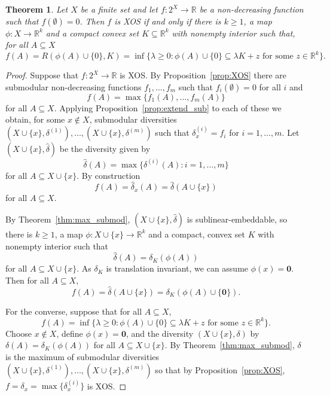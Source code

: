 \documentclass{article}
\theoremstyle{plain}
\newtheorem{theorem}{Theorem}
\theoremstyle{definition}
\newcommand{\whd}{\widehat{\delta}}
\renewcommand{\Re}{\mathbb{R}}
\begin{document}
\begin{theorem}
    Let $X$ be a finite set and let $f:2^X \rightarrow \Re$ be a non-decreasing function such that $f(\emptyset) = 0$. Then $f$ is XOS if and only if there is $k \geq 1$, a map $\phi:X \rightarrow \Re^k$ and a compact convex set $K \subseteq \Re^k$ with nonempty interior such that, for all $A \subseteq X$
\[f(A) = R(\phi(A) \cup \{0\},K) = \inf \{\lambda \geq 0: \phi(A) \cup \{0\} \subseteq \lambda K + z \mbox{ for some $z \in \Re^k $} \}.\]
\end{theorem}
\begin{proof}
    Suppose that $f:2^X \rightarrow \Re$ is XOS. By Proposition~\ref{prop:XOS} there are submodular non-decreasing functions $f_1,\ldots,f_m$ such that $f_i(\emptyset) = 0$ for all $i$ and 
    \[f(A) = \max\{f_1(A),\ldots,f_m(A)\}\]
    for all $A \subseteq X$. Applying Proposition~\ref{prop:extend_sub} to each of these we obtain, for some $x \not \in  X$, submodular diversities $(X \cup \{x\},\delta^{(1)}),\ldots,(X \cup \{x\},\delta^{(m)})$  such that $\delta^{(i)}_x = f_i$ for $i=1,\ldots,m$. Let $(X\cup \{x\},\whd)$ be the diversity given by 
    \[\whd(A) = \max\{\delta^{(i)}(A): i=1,\ldots,m\}\]
    for all $A \subseteq X \cup \{x\}$. By construction 
    \[f(A) = \whd_x(A) = \whd(A \cup \{x\})\]
    for all $A \subseteq X$.
    
    By Theorem~\ref{thm:max_submod}, $(X \cup \{x\},\whd)$ is sublinear-embeddable, so there is $k \geq 1$, a map $\phi:X \cup \{x\} \rightarrow \Re^k$ and a compact, convex set $K$ with nonempty interior such that 
    \[\whd(A) = \delta_K(\phi(A))\]
    for all $A \subseteq X \cup \{x\}$. As $\delta_K$ is translation invariant, we can assume $\phi(x) = \mathbf{0}$. Then for all $A \subseteq X$,
    \[f(A) = \whd(A \cup \{x\}) = \delta_K(\phi(A) \cup \{\mathbf{0}\}).\]

    For the converse, suppose that for all $A \subseteq X$,
\[f(A) =  \inf \{\lambda \geq 0: \phi(A) \cup \{0\} \subseteq \lambda K + z \mbox{ for some $z \in \Re^k $} \}.\]
Choose $x \not \in X$, define $\phi(x) = \mathbf{0}$, and the diversity $(X \cup \{x\},\delta)$ by $\delta(A) = \delta_K(\phi(A))$ for all $A \subseteq X \cup \{x\}$. By Theorem~\ref{thm:max_submod}, $\delta$ is the maximum of submodular diversities $(X \cup \{x\},\delta^{(1)}),\ldots,(X \cup \{x\},\delta^{(m)})$ so that by Proposition~\ref{prop:XOS}, $f = \delta_x = \max\{\delta^{(i)}_x\}$ is XOS.     
\end{proof}
\end{document}
